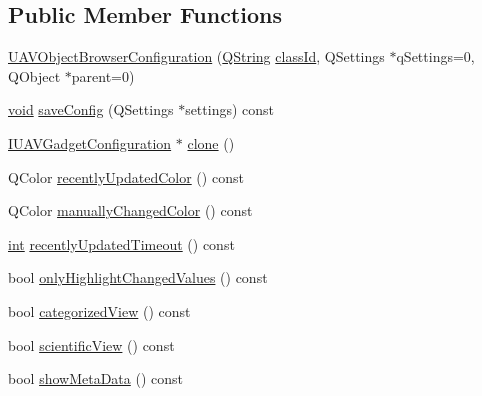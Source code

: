 \subsection*{Public Member Functions}
\begin{DoxyCompactItemize}
\item 
\hyperlink{group___u_a_v_object_browser_plugin_ga70fd7664c3f0a9a97f0003bc04e5dc42}{U\-A\-V\-Object\-Browser\-Configuration} (\hyperlink{group___u_a_v_objects_plugin_gab9d252f49c333c94a72f97ce3105a32d}{Q\-String} \hyperlink{group___core_plugin_gac953657221ba7fda967ada0408332641}{class\-Id}, Q\-Settings $\ast$q\-Settings=0, Q\-Object $\ast$parent=0)
\item 
\hyperlink{group___u_a_v_objects_plugin_ga444cf2ff3f0ecbe028adce838d373f5c}{void} \hyperlink{group___u_a_v_object_browser_plugin_gadb33bf1275b4c9f13153755f9f333042}{save\-Config} (Q\-Settings $\ast$settings) const 
\item 
\hyperlink{group___core_plugin_gacdfdf0b1e39b5002472b76b6564ce51f}{I\-U\-A\-V\-Gadget\-Configuration} $\ast$ \hyperlink{group___u_a_v_object_browser_plugin_ga0bf31a4c146a973fe414471258c40b9a}{clone} ()
\item 
Q\-Color \hyperlink{group___u_a_v_object_browser_plugin_gabd9e62445c6dafe38aff2aa05e0b63e0}{recently\-Updated\-Color} () const 
\item 
Q\-Color \hyperlink{group___u_a_v_object_browser_plugin_ga3c96e42ba99892a40daa0e4140285ccd}{manually\-Changed\-Color} () const 
\item 
\hyperlink{ioapi_8h_a787fa3cf048117ba7123753c1e74fcd6}{int} \hyperlink{group___u_a_v_object_browser_plugin_ga3aabfce2aedab253f923829311c4e07d}{recently\-Updated\-Timeout} () const 
\item 
bool \hyperlink{group___u_a_v_object_browser_plugin_gafaf541f03652cd6f57909b0e8c453695}{only\-Highlight\-Changed\-Values} () const 
\item 
bool \hyperlink{group___u_a_v_object_browser_plugin_gadc4b65d3776b63289a8e2981af3d218b}{categorized\-View} () const 
\item 
bool \hyperlink{group___u_a_v_object_browser_plugin_ga70ab8d21181971d5e78925921d9ce52c}{scientific\-View} () const 
\item 
bool \hyperlink{group___u_a_v_object_browser_plugin_ga02fed63cf79eb853363190d6db4139c7}{show\-Meta\-Data} () const 
\end{DoxyCompactItemize}
